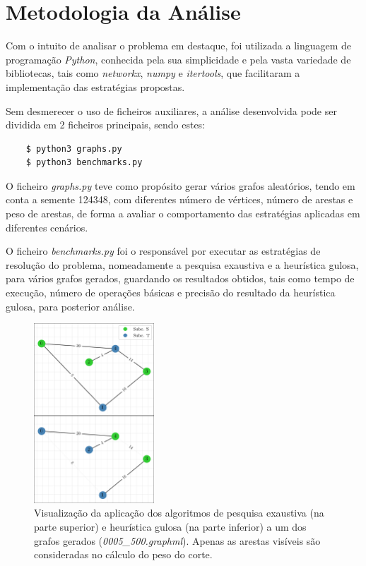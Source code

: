 \documentclass[mirror]{revdetua}
\begin{document}
\section{Metodologia da Análise}

Com o intuito de analisar o problema em destaque, foi utilizada a linguagem de programação \textit{Python}, conhecida pela sua simplicidade e pela vasta variedade de bibliotecas, tais como \textit{networkx}, \textit{numpy} e \textit{itertools}, que facilitaram a implementação das estratégias propostas.

Sem desmerecer o uso de ficheiros auxiliares, a análise desenvolvida pode ser dividida em 2 ficheiros principais, sendo estes:
\begin{verbatim}
    $ python3 graphs.py
    $ python3 benchmarks.py
\end{verbatim}

O ficheiro \textit{graphs.py} teve como propósito gerar vários grafos aleatórios, tendo em conta a semente 124348, com diferentes número de vértices, número de arestas e peso de arestas, de forma a avaliar o comportamento das estratégias aplicadas em diferentes cenários.

O ficheiro \textit{benchmarks.py} foi o responsável por executar as estratégias de resolução do problema, nomeadamente a pesquisa exaustiva e a heurística gulosa, para vários grafos gerados, guardando os resultados obtidos, tais como tempo de execução, número de operações básicas e precisão do resultado da heurística gulosa, para posterior análise.

\begin{figure}[h]
    \centering
    \includegraphics[width=0.4\textwidth]{../assets/exampGraph.png}
    \caption{Visualização da aplicação dos algoritmos de pesquisa exaustiva (na parte superior) e heurística gulosa (na parte inferior) a um dos grafos gerados (\textit{0005\_500.graphml}). Apenas as arestas visíveis são consideradas no cálculo do peso do corte.}
    \label{fig:exmpgraph2}
\end{figure}
\end{document}
